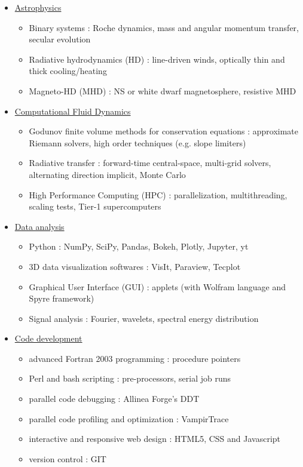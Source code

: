 \documentclass[12pt,onecolumn]{article}
\begin{document}
\begin{adjustwidth}{-0.5cm}{-0.5cm}
\begin{itemize} 
\setlength\itemsep{-0.2em}
\setlength{\itemindent}{-1em}
\item[] \underline{Astrophysics}
\begin{itemize}[wide = 0pt]
\setlength\itemsep{-0.2em}
\setlength{\itemindent}{-0.5em}
\item Binary systems : Roche dynamics, mass and angular momentum transfer, secular evolution 
\item Radiative hydrodynamics (HD) : line-driven winds, optically thin and thick cooling/heating
\item Magneto-HD (MHD) : NS or white dwarf magnetosphere, resistive MHD
\end{itemize}
\item[] \underline{Computational Fluid Dynamics}
\begin{itemize}[wide = 2pt]
\setlength\itemsep{-0.2em}
\setlength{\itemindent}{-0.5em}
\item Godunov finite volume methods for conservation equations : approximate Riemann solvers, high order techniques (e.g. slope limiters)
\item Radiative transfer : forward-time central-space, multi-grid solvers, alternating direction implicit, Monte Carlo
\item High Performance Computing (HPC) : parallelization, multithreading, scaling tests, Tier-1 supercomputers
\end{itemize}
\item[] \underline{Data analysis } 
\begin{itemize}[wide = 20pt]
\setlength\itemsep{-0.2em}
\setlength{\itemindent}{-0.5em}
\item Python : NumPy, SciPy, Pandas, Bokeh, Plotly, Jupyter, yt
\item 3D data visualization softwares : VisIt, Paraview, Tecplot
\item Graphical User Interface (GUI) : applets (with Wolfram language and Spyre framework)
\item Signal analysis : Fourier, wavelets, spectral energy distribution
\end{itemize}
\item[] \underline{Code development}
\begin{itemize}[wide = 8pt]
\setlength\itemsep{-0.2em}
\setlength{\itemindent}{-0.5em}
\item advanced Fortran 2003 programming : procedure pointers
\item Perl and bash scripting : pre-processors, serial job runs
\item parallel code debugging : Allinea Forge's DDT
\item parallel code profiling and optimization : VampirTrace 
\item interactive and responsive web design : HTML5, CSS and Javascript
\item version control : GIT
\end{itemize}
\end{itemize}

\end{adjustwidth}
\end{document}

